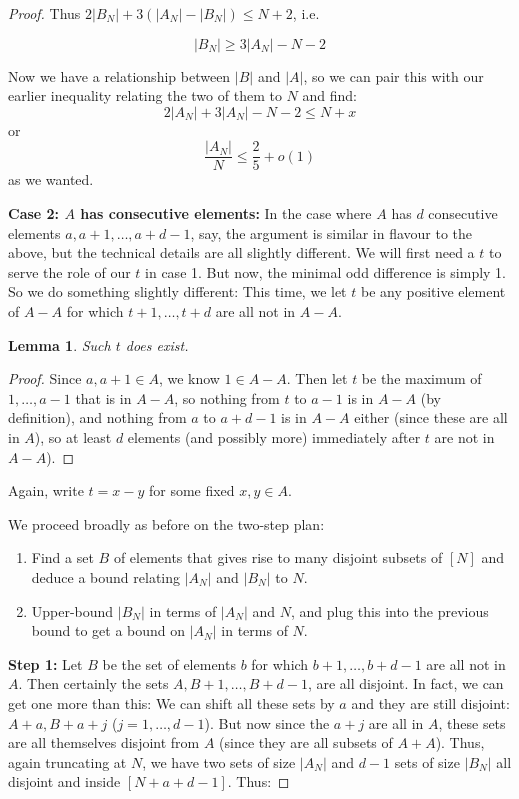 \documentclass{report}
\newtheorem{lemma}[theorem]{Lemma}
\theoremstyle{remark}
\numberwithin{equation}{section}
\begin{document}
\begin{proof}
Thus $2|B_N| + 3(|A_N| - |B_N|) \leq N+2$, i.e.

\[|B_N| \geq 3|A_N| - N - 2\]

Now we have a relationship between $|B|$ and $|A|$, so we can pair
this with our earlier inequality relating the two of them to $N$ and
find:
\[2|A_N| + 3|A_N| - N - 2 \leq N+x \]
or 
\[\frac{|A_N|}{N} \leq \frac25+o(1) \]
as we wanted.

\textbf{Case 2: $A$ has consecutive elements:} In the case where $A$
has $d$ consecutive elements $a, a+1, \ldots, a+d-1$, say, the
argument is similar in flavour to the above, but the technical details
are all slightly different.  We will first need a $t$ to serve the
role of our $t$ in case 1.  But now, the minimal odd difference is
simply 1.  So we do something slightly different: This time, we let
$t$ be any positive element of $A-A$ for which $t+1, \ldots, t+d$ are
all not in $A-A$.  

\begin{lemma}Such $t$ does exist.\end{lemma}

\begin{proof}Since $a, a+1 \in A$, we know $1 \in A-A$.  Then let $t$
  be the maximum of $1, \ldots, a-1$ that is in $A-A$, so nothing from
  $t$ to $a-1$ is in $A-A$ (by definition), and nothing from $a$ to
  $a+d-1$ is in $A-A$ either (since these are all in $A$), so at least
  $d$ elements (and possibly more) immediately after $t$ are not in
  $A-A$).
\end{proof}

Again, write $t = x-y$ for some fixed $x, y \in A$.

We proceed broadly as before on the two-step plan: 

\begin{enumerate}
\item Find a set $B$ of elements that gives rise to many disjoint
  subsets of $[N]$ and deduce a bound relating $|A_N|$ and $|B_N|$ to
  $N$.
\item Upper-bound $|B_N|$ in terms of $|A_N|$ and $N$, and plug this
  into the previous bound to get a bound on $|A_N|$ in terms of $N$.
\end{enumerate}

\textbf{Step 1: }Let $B$ be the set of elements $b$ for which
$b+1, \ldots, b+d-1$ are all not in $A$.  Then certainly the sets
$A, B+1, \ldots, B+d-1$, are all disjoint.  In fact, we can get one
more than this: We can shift all these sets by $a$ and they are still
disjoint: $A+a, B+a+j$ ($j=1, \ldots, d-1$).  But now since the $a+j$
are all in $A$, these sets are all themselves disjoint from $A$ (since
they are all subsets of $A+A$).  Thus, again truncating at $N$, we
have two sets of size $|A_N|$ and $d-1$ sets of size $|B_N|$ all
disjoint and inside $[N+a+d-1]$.  Thus:


\end{proof}
\end{document}
